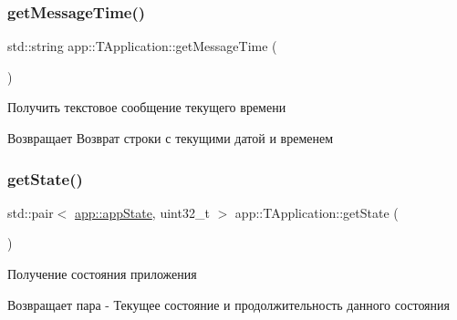 \subsubsection{\texorpdfstring{get\+Message\+Time()}{getMessageTime()}}
{\footnotesize\ttfamily std\+::string app\+::\+T\+Application\+::get\+Message\+Time (\begin{DoxyParamCaption}{ }\end{DoxyParamCaption})}



Получить текстовое сообщение текущего времени 

\begin{DoxyReturn}{Возвращает}
Возврат строки с текущими датой и временем 
\end{DoxyReturn}
\mbox{\label{classapp_1_1_t_application_a254728135b699d84f82a334708b1fbda}} 
\subsubsection{\texorpdfstring{get\+State()}{getState()}}
{\footnotesize\ttfamily std\+::pair$<$ \hyperlink{group___xD0_x9F_xD0_xB5_xD1_x80_xD0_xB5_xD1_x87_xD0_xB8_xD1_x81_xD0_xBB_xD0_xB5_xD0_xBD_xD0_xB8_xD1_x8F_ga290e8080c661e52c2f685fd4af148acf}{app\+::app\+State}, uint32\+\_\+t $>$ app\+::\+T\+Application\+::get\+State (\begin{DoxyParamCaption}{ }\end{DoxyParamCaption})}



Получение состояния приложения 

\begin{DoxyReturn}{Возвращает}
пара -\/ Текущее состояние и продолжительность данного состояния 
\end{DoxyReturn}
\mbox{\label{classapp_1_1_t_application_ad6812ead3b88d21dc886d5e4d3bbfaab}} 
